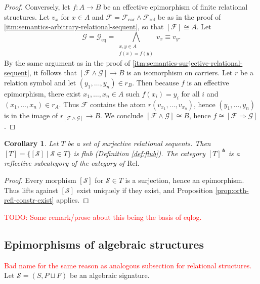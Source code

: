 \documentclass[a4paper]{article}
\newcommand{\todo}[1]{\textcolor{red}{#1}}
\newtheorem{corollary}[theorem]{Corollary}
\theoremstyle{remark}
\theoremstyle{definition}
\begin{document}
\begin{proof}
  
  Conversely, let $f : A \rightarrow B$ be an effective epimorphism of finite relational structures.
  Let $v_x$ for $x \in A$ and $\mathcal{F} = \mathcal{F}_\mathrm{car} \land \mathcal{F}_\mathrm{rel}$ be as in the proof of \ref{itm:semantics-arbitrary-relational-sequent}, so that $[\mathcal{F}] \cong A$.
  Let
  \begin{equation}
    \mathcal{G} = \mathcal{G}_\mathrm{eq} = \bigwedge_{\substack{x, y \in A\\f(x) = f(y)}} v_x \equiv v_y.
  \end{equation}
  By the same argument as in the proof of \ref{itm:semantics-surjective-relational-sequent}, it follows that $[\mathcal{F} \land \mathcal{G}] \rightarrow B$ is an isomorphism on carriers.
  Let $r$ be a relation symbol and let $(y_1, \dots, y_n) \in r_B$.
  Then because $f$ is an effective epimorphism, there exist $x_1, \dots, x_n \in A$ such $f(x_i) = y_i$ for all $i$ and $(x_1, \dots, x_n) \in r_A$.
  Thus $\mathcal{F}$ contains the atom $r(v_{x_1}, \dots, v_{x_n})$, hence $(y_1, \dots, y_n)$ is in the image of $r_{[\mathcal{F} \land \mathcal{G}]} \rightarrow B$.
  We conclude $[\mathcal{F} \land \mathcal{G}] \cong B$, hence $f \cong [\mathcal{F} \Rightarrow \mathcal{G}]$. 
\end{proof}

\begin{corollary}
  Let $T$ be a set of surjective relational sequents.
  Then $[T] = \{ [\mathcal{S}] \mid \mathcal{S} \in T\}$ is flub (Definition \ref{def:flub}).
  The category $[T]^\pitchfork$ is a reflective subcategory of the category of $\mathrm{Rel}$.
\end{corollary}
\begin{proof}
  Every morphism $[\mathcal{S}]$ for $\mathcal{S} \in T$ is a surjection, hence an epimorphism.
  Thus lifts against $[\mathcal{S}]$ exist uniquely if they exist, and Proposition \ref{prop:orth-refl-constr-exist} applies.
\end{proof}

\todo{
  TODO: Some remark/prose about this being the basis of eqlog.
}

\subsection{Epimorphisms of algebraic structures}
\todo{
  Bad name for the same reason as analogous subsection for relational structures.
}
Let $\mathcal{S} = (S, P \sqcup F)$ be an algebraic signature.
\end{document}
